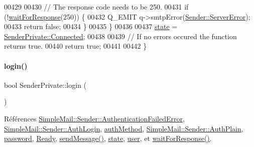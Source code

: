 \begin{DoxyCode}
00429 
00430         \textcolor{comment}{// The response code needs to be 250.}
00431         \textcolor{keywordflow}{if} (!\hyperlink{class_simple_mail_1_1_sender_private_af8ba23dc3e1201d303ad1d923235c71c}{waitForResponse}(250)) \{
00432             Q\_EMIT q->smtpError(\hyperlink{class_simple_mail_1_1_sender_a276560e9e955ab6be451338c3776bf49aa5d58da2b004bb7275a92029fe432089}{Sender::ServerError});
00433             \textcolor{keywordflow}{return} \textcolor{keyword}{false};
00434         \}
00435     \}
00436 
00437     \hyperlink{class_simple_mail_1_1_sender_private_af73e80fdae8024d12714f6f3a1cc1e23}{state} = \hyperlink{class_simple_mail_1_1_sender_private_ae09befddf0fae8e8f2ea153ead2b8b0aa81776327acf2e160bb969693bdc4bc3b}{SenderPrivate::Connected};
00438 
00439     \textcolor{comment}{// If no errors occured the function returns true.}
00440     \textcolor{keywordflow}{return} \textcolor{keyword}{true};
00441 
00442 \}
\end{DoxyCode}
\mbox{\label{class_simple_mail_1_1_sender_private_a927e5c262ee89fb335410ebec020091d}} 
\paragraph{\texorpdfstring{login()}{login()}}
{\footnotesize\ttfamily bool Sender\+Private\+::login (\begin{DoxyParamCaption}{ }\end{DoxyParamCaption})}



Références \hyperlink{class_simple_mail_1_1_sender_a276560e9e955ab6be451338c3776bf49a2d402af356c1513cf08749bf7a204703}{Simple\+Mail\+::\+Sender\+::\+Authentication\+Failed\+Error}, \hyperlink{class_simple_mail_1_1_sender_af50defb714bc3e95f47c71a9ba6ee6bba7e64ad152ea68f105718f3680f8f054b}{Simple\+Mail\+::\+Sender\+::\+Auth\+Login}, \hyperlink{class_simple_mail_1_1_sender_private_afd60fe3edc740b9624746316ad798647}{auth\+Method}, \hyperlink{class_simple_mail_1_1_sender_af50defb714bc3e95f47c71a9ba6ee6bba28927645560285ef540f6f2471be4584}{Simple\+Mail\+::\+Sender\+::\+Auth\+Plain}, \hyperlink{class_simple_mail_1_1_sender_private_aac5b192258bcf97c2249fc944c17ee32}{password}, \hyperlink{class_simple_mail_1_1_sender_private_ae09befddf0fae8e8f2ea153ead2b8b0aac1f1f30c7c54375f9bed9a95bd082416}{Ready}, \hyperlink{class_simple_mail_1_1_sender_private_a01805bb24291bf6cad3a656a16d0bb25}{send\+Message()}, \hyperlink{class_simple_mail_1_1_sender_private_af73e80fdae8024d12714f6f3a1cc1e23}{state}, \hyperlink{class_simple_mail_1_1_sender_private_ac3efab988a41e60a0a56c29a1d5b04ed}{user}, et \hyperlink{class_simple_mail_1_1_sender_private_af8ba23dc3e1201d303ad1d923235c71c}{wait\+For\+Response()}.



